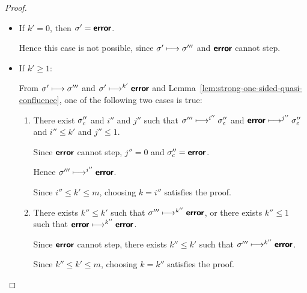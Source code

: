 \begin{proof}
\begin{enumerate}
\begin{itemize}
    \item If $k' = 0$, then $\sigma' = \textbf{\textsf{error}}$.

      Hence this case is not possible, since $\sigma' \longmapsto
      \sigma'''$ and $\textbf{\textsf{error}}$ cannot step.

    \item If $k' \geq 1$:

      From $\sigma' \longmapsto \sigma'''$ and $\sigma' \longmapsto^{k'}
      \textbf{\textsf{error}}$ and Lemma~\ref{lem:strong-one-sided-quasi-confluence},
      one of the following two cases is true:

      \begin{enumerate}
        \item There exist $\sigma''_c$ and $i''$ and $j''$ such that
          $\sigma''' \longmapsto^{i''} \sigma''_c$ and $\textbf{\textsf{error}}
          \longmapsto^{j''} \sigma''_c$ and $i'' \leq k'$ and $j'' \leq
          1$.

          Since $\textbf{\textsf{error}}$ cannot step, $j'' = 0$ and $\sigma''_c =
          \textbf{\textsf{error}}$.

          Hence $\sigma''' \longmapsto^{i''} \textbf{\textsf{error}}$.

          Since $i'' \leq k' \leq m$, choosing $k = i''$ satisfies the
          proof.

        \item There exists $k'' \leq k'$ such that $\sigma'''
          \longmapsto^{k''} \textbf{\textsf{error}}$, or there exists $k'' \leq 1$ such
          that $\textbf{\textsf{error}} \longmapsto^{k''} \textbf{\textsf{error}}$.

          Since $\textbf{\textsf{error}}$ cannot step, there exists $k'' \leq k'$ such
          that $\sigma''' \longmapsto^{k''} \textbf{\textsf{error}}$.

          Since $k'' \leq k' \leq m$, choosing $k = k''$ satisfies the
          proof.
      \end{enumerate}
    \end{itemize}
  \end{enumerate}

\end{proof}
